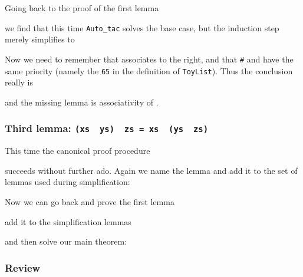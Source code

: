 Going back to the proof of the first lemma
\begin{ttbox}\makeatother
\end{ttbox}
we find that this time \texttt{Auto_tac} solves the base case, but the
induction step merely simplifies to
\begin{ttbox}\makeatother
{}
\end{ttbox}
Now we need to remember that \texttt{\at} associates to the right, and that
\texttt{\#} and \texttt{\at} have the same priority (namely the \texttt{65}
in the definition of \texttt{ToyList}). Thus the conclusion really is
\begin{ttbox}\makeatother
{}
\end{ttbox}
and the missing lemma is associativity of \texttt{\at}.

\subsubsection*{Third lemma: \texttt{(xs \at~ys) \at~zs = xs \at~(ys \at~zs)}}

This time the canonical proof procedure
\begin{ttbox}\makeatother
\end{ttbox}
succeeds without further ado. Again we name the lemma and add it to
the set of lemmas used during simplification:
\begin{ttbox}
\end{ttbox}
Now we can go back and prove the first lemma
\begin{ttbox}\makeatother
\end{ttbox}
add it to the simplification lemmas
\begin{ttbox}
\end{ttbox}
and then solve our main theorem:
\begin{ttbox}\makeatother
\end{ttbox}

\subsubsection*{Review}

